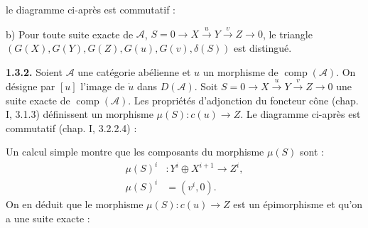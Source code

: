 \clearpage
{}%
\begingroup\small\setlength{\parskip}{0pt}\setlength{\emergencystretch}{1.5em}
\setlength{\abovedisplayskip}{4pt plus 2pt minus 2pt}%
\setlength{\belowdisplayskip}{4pt plus 2pt minus 2pt}%

le diagramme ci-après est commutatif :

\begin{center}
\end{center}

\noindent b) Pour toute suite exacte de $\mathcal A$,
$S=0\longrightarrow X\xrightarrow{u}Y\xrightarrow{v}Z\longrightarrow0$,
le triangle
$(G(X),\allowbreak G(Y),\allowbreak G(Z),\allowbreak G(u),\allowbreak
G(v),\allowbreak\delta(S))$ est distingué.

\medskip\noindent\textbf{1.3.2.}\quad
Soient $\mathcal A$ une catégorie abélienne et $u$ un morphisme de
$\operatorname{comp}(\mathcal A)$. On désigne par $[u]$ l'image de
$\dot u$ dans $D(\mathcal A)$. Soit
$S=0\longrightarrow X\xrightarrow{u}Y\xrightarrow{v}Z\longrightarrow0$
une suite exacte de $\operatorname{comp}(\mathcal A)$. Les propriétés
d'adjonction du foncteur cône (chap. I, 3.1.3) définissent un morphisme
$\mu(S)\colon c(u)\longrightarrow Z$. Le diagramme ci-après est commutatif
(chap. I, 3.2.2.4) :

\begin{center}
\end{center}

Un calcul simple montre que les composants du morphisme $\mu(S)$ sont :
\begin{equation}
\begin{aligned}
\mu(S)^i&\colon Y^i\oplus X^{i+1}\longrightarrow Z^i,\\
\mu(S)^i&=(v^i,0).
\end{aligned}
\tag{1.3.2.1}
\end{equation}
On en déduit que le morphisme $\mu(S)\colon c(u)\longrightarrow Z$ est un
épimorphisme et qu'on a une suite exacte :

